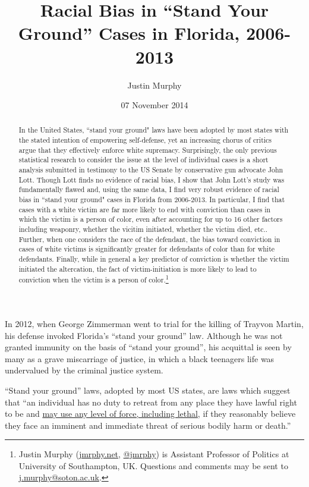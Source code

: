\documentclass[12pt,article]{article}
\title{Racial Bias in ``Stand Your Ground'' Cases in Florida, 2006-2013}
\author{Justin Murphy}
\date{07 November 2014}
\begin{document}
\maketitle


\begin{abstract}
In the United States, ``stand your ground" laws have been adopted by most states with the stated intention of empowering self-defense, yet an increasing chorus of critics argue that they effectively enforce white supremacy. Surprisingly, the only previous statistical research to consider the issue at the level of individual cases is a short analysis submitted in testimony to the US Senate by conservative gun advocate John Lott. Though Lott finds no evidence of racial bias, I show that John Lott's study was fundamentally flawed and, using the same data, I find very robust evidence of racial bias in ``stand your ground" cases in Florida from 2006-2013. In particular, I find that cases with a white victim are far more likely to end with conviction than cases in which the victim is a person of color, even after accounting for up to 16 other factors including weaponry, whether the vicitim initiated, whether the victim died, etc.. Further, when one considers the race of the defendant, the bias toward conviction in cases of white victims is significantly greater for defendants of color than for white defendants. Finally, while in general a key predictor of conviction is whether the victim initiated the altercation, the fact of victim-initiation is more likely to lead to conviction when the victim is a person of color.\footnote{Justin Murphy (\url{jmrphy.net}, \href{http://twitter.com/jmrphy}{@jmrphy}) is Assistant Professor of Politics at University of Southampton, UK. Questions and comments may be sent to \href{mailto:j.murphy@soton.ac.uk}{j.murphy@soton.ac.uk}.}
\end{abstract}
\onehalfspacing

In 2012, when George Zimmerman went to trial for the killing of Trayvon
Martin, his defense invoked Florida's ``stand your ground'' law.
Although he was not granted immunity on the basis of ``stand your
ground'', his acquittal is seen by many as a grave miscarriage of
justice, in which a black teenagers life was undervalued by the criminal
justice system.

``Stand your ground'' laws, adopted by most US states, are laws which
suggest that ``an individual has no duty to retreat from any place they
have lawful right to be and
\href{http://en.wikipedia.org/wiki/Stand-your-ground_law}{may use any
level of force, including lethal}, if they reasonably believe they face
an imminent and immediate threat of serious bodily harm or death.''
\end{document}

